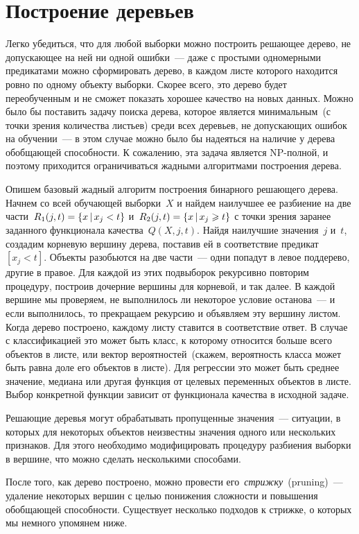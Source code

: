 \documentclass[12pt,fleqn]{article}
\begin{document}
\section{Построение деревьев}
Легко убедиться, что для любой выборки можно построить решающее дерево,
не допускающее на ней ни одной ошибки~--- даже с простыми одномерными предикатами
можно сформировать дерево, в каждом листе которого находится ровно по одному объекту выборки.
Скорее всего, это дерево будет переобученным и не сможет показать хорошее качество
на новых данных.
Можно было бы поставить задачу поиска дерева, которое является минимальным~(с точки зрения количества листьев)
среди всех деревьев, не допускающих ошибок на обучении~--- в этом случае можно было бы
надеяться на наличие у дерева обобщающей способности.
К сожалению, эта задача является NP-полной,
и поэтому приходится ограничиваться жадными алгоритмами построения дерева.

Опишем базовый жадный алгоритм построения бинарного решающего дерева.
Начнем со всей обучающей выборки~$X$ и найдем наилучшее ее разбиение
на две части~$R_1(j, t) = \{x \mspace{3mu}{|}\mspace{3mu} x_j < t\}$ и~$R_2(j, t) = \{x \mspace{3mu}{|}\mspace{3mu} x_j \geqslant t\}$
с точки зрения заранее заданного функционала качества~$Q(X, j, t)$.
Найдя наилучшие значения~$j$ и~$t$, создадим корневую вершину дерева,
поставив ей в соответствие предикат~$[x_j < t]$.
Объекты разобьются на две части~--- одни попадут в левое поддерево, другие в правое.
Для каждой из этих подвыборок рекурсивно повторим процедуру, построив дочерние вершины для корневой,
и так далее.
В каждой вершине мы проверяем, не выполнилось ли некоторое условие останова~--- и если выполнилось,
то прекращаем рекурсию и объявляем эту вершину листом.
Когда дерево построено, каждому листу ставится в соответствие ответ.
В случае с классификацией это может быть класс, к которому относится больше всего
объектов в листе, или вектор вероятностей~(скажем, вероятность класса может
быть равна доле его объектов в листе).
Для регрессии это может быть среднее значение, медиана или другая функция от целевых переменных
объектов в листе.
Выбор конкретной функции зависит от функционала качества в исходной задаче.

Решающие деревья могут обрабатывать пропущенные значения~--- ситуации, в которых для некоторых
объектов неизвестны значения одного или нескольких признаков.
Для этого необходимо модифицировать процедуру разбиения выборки в вершине,
что можно сделать несколькими способами.

После того, как дерево построено, можно провести его~\emph{стрижку}~(pruning)~---
удаление некоторых вершин с целью понижения сложности и повышения обобщающей способности.
Существует несколько подходов к стрижке, о которых мы немного упомянем ниже.
\end{document}
